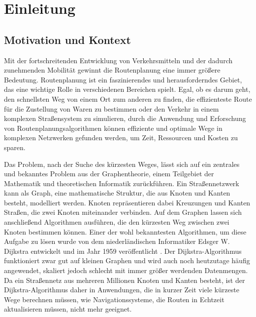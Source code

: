 \section{Einleitung}

\subsection{Motivation und Kontext}
Mit der fortschreitenden Entwicklung von Verkehrsmitteln und der dadurch zunehmenden Mobilität
gewinnt die Routenplanung eine immer größere Bedeutung. Routenplanung ist ein faszinierendes und
herausforderndes Gebiet, das eine wichtige Rolle in verschiedenen Bereichen spielt. Egal, ob es
darum geht, den schnellsten Weg von einem Ort zum anderen zu finden, die effizienteste Route für die
Zustellung von Waren zu bestimmen oder den Verkehr in einem komplexen Straßensystem zu simulieren,
durch die Anwendung und Erforschung von Routenplanungsalgorithmen können effiziente und optimale
Wege in komplexen Netzwerken gefunden werden, um Zeit, Ressourcen und Kosten zu sparen.


Das Problem, nach der Suche des kürzesten Weges, lässt sich auf ein zentrales und bekanntes Problem
aus der Graphentheorie, einem Teilgebiet der Mathematik und theoretischen Informatik 
zurückführen. Ein Straßennetzwerk kann als Graph, eine mathematische Struktur, die aus Knoten und
Kanten besteht, modelliert werden. Knoten repräsentieren dabei Kreuzungen und Kanten Straßen, die zwei
Knoten miteinander verbinden. Auf dem Graphen lassen sich anschließend Algorithmen ausführen, die
den kürzesten Weg zwischen zwei Knoten bestimmen können. Einer der wohl bekanntesten Algorithmen, um
diese Aufgabe zu lösen wurde von dem niederländischen Informatiker Edsger W. Dijkstra entwickelt und
im Jahr 1959 veröffentlicht \cite{Dijkstra_1959}. Der Dijkstra-Algorithmus funktioniert zwar gut auf
kleinen Graphen und wird auch noch heutzutage häufig angewendet, skaliert jedoch schlecht mit immer
größer werdenden Datenmengen. Da ein Straßennetz aus mehreren Millionen Knoten und Kanten besteht,
ist der Dijkstra-Algorithmus daher in Anwendungen, die in kurzer Zeit viele kürzeste Wege berechnen
müssen, wie \zB Navigationssysteme, die Routen in Echtzeit aktualisieren müssen, nicht mehr geeignet.


